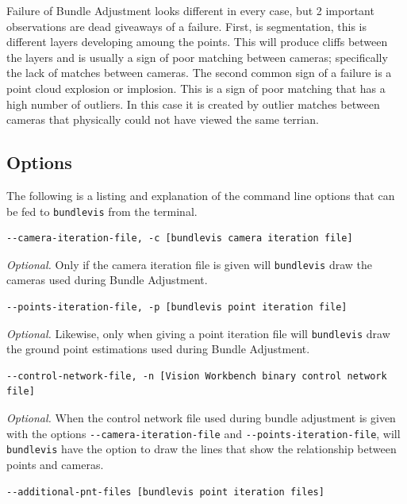 Failure of Bundle Adjustment looks different in every case,
but 2 important observations are dead giveaways of a failure. First,
is segmentation, this is different layers developing amoung the
points. This will produce cliffs between the layers and is usually a
sign of poor matching between cameras; specifically the lack of
matches between cameras. The second common sign of a failure is a
point cloud explosion or implosion. This is a sign of poor matching
that has a high number of outliers. In this case it is created
by outlier matches between cameras that physically could not have viewed the
same terrian.


\subsection{Options}

The following is a listing and explanation of the command line options
that can be fed to \texttt{bundlevis} from the terminal.

\begin{verbatim}
--camera-iteration-file, -c [bundlevis camera iteration file]
\end{verbatim}

\emph{Optional.} Only if the camera iteration file is given will
\texttt{bundlevis} draw the cameras used during Bundle Adjustment.

\begin{verbatim}
--points-iteration-file, -p [bundlevis point iteration file]
\end{verbatim}

\emph{Optional.} Likewise, only when giving a point iteration file
will \texttt{bundlevis} draw the ground point estimations used during
Bundle Adjustment.

\begin{verbatim}
--control-network-file, -n [Vision Workbench binary control network file]
\end{verbatim}

\emph{Optional.} When the control network file used during bundle
adjustment is given with the options \verb=--camera-iteration-file=
and \verb=--points-iteration-file=, will \texttt{bundlevis} have the
option to draw the lines that show the relationship between points and
cameras.

\begin{verbatim}
--additional-pnt-files [bundlevis point iteration files]
\end{verbatim}

